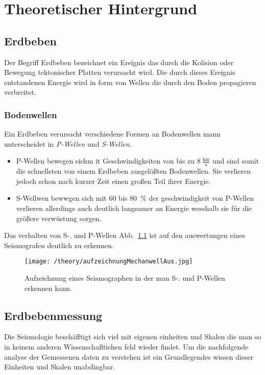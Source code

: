 \documentclass[class=scrbook, crop=false]{standalone}
\begin{document}
\ifstandalone

    
\fi

\chapter{Theoretischer Hintergrund}
\section{Erdbeben}
Der Begriff Erdbeben bezeichnet ein Ereignis das durch die Kolision oder Bewegung tektonischer Platten verursacht wird. Die durch dieses Ereignis entstandenen Energie wird in form von Wellen die durch den Boden propagieren verbreitet.
\subsection{Bodenwellen}
Ein Erdbeben verursacht verschiedene Formen an Bodenwellen mann unterscheidet in  \textit{P-Wellen} und \textit{S-Wellen}.\\
\begin{itemize}
\item
P-Wellen bewegen sichm it Geschwindigkeiten von bis zu $8~\mathrm{\frac{km}{s}}$  und sind somit die schnellsten von einem Erdbeben ausgelößten Bodenwellen. Sie verlieren jedoch schon nach kurzer Zeit einen großen Teil ihrer Energie.
\item
S-Wellwen bewwgen sich mit 60 bis 80~\% der geschwindigkeit von P-Wellen verlieren allerdings auch deutlich langsamer an Energie wesshalb sie für die größere verwüstung sorgen.
\end{itemize}
Das verhalten von S-. und P-Wellen Abb.~\ref{fig: wellen} ist auf den auswertungen eines Seismografen deutlich zu erkennen.
\begin{figure}[h]
	\texttt{[image: /theory/aufzeichnungMechanwellAus.jpg]}
	\label{fig: wellen}
	\caption{Aufzeichnung eines Seismographen in der man S-. und P-Wellen erkennen kann.}

\end{figure}

\section{Erdbebenmessung}
Die Seismologie beschäfftigt sich viel mit eigenen einheiten und Skalen die man so in keinem anderen Wissenschafltichen feld wieder findet. Um die nachfolgende analyse der Gemessenen daten zu verstehen ist ein Grundlegendes wissen dieser Einheiten und Skalen unabdingbar.
\end{document}
